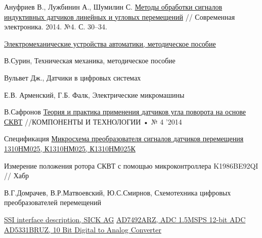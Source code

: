 \newpage
\renewcommand{\bibsection}{\centering\textbf{\large Список использованных источников}} %


\begin{thebibliography}{9}
    Ануфриев В., Лужбинин А., Шумилин С. 
    \href{https://www.milandr.ru/upload/iblock/4bf/4bf1c97fcce296a450d7b68bb0fc65b0.pdf}{Методы обработки сигналов индуктивных датчиков линейных и угловых перемещений} // Современная электроника. 2014. №4. С. 30–34.

    \href{https://servomotors.ru/documentation/electromechanical_automation_devices/book/about.html}{Электромеханические устройства автоматики, методическое пособие} 

     В.Сурин, Техническая механика, методическое пособие 

     Вульвет Дж., Датчики в цифровых системах

     Е.В. Арменский, Г.Б. Фалк, Электрические микромашины

    В.Сафронов
    \href{file:///home/viktor/Downloads/teoriya-i-praktika-primeneniya-datchikov-ugla-povorota-na-osnove-skvt.pdf}{Теория и практика применения датчиков угла поворота на основе СКВТ} 
    //КОМПОНЕНТЫ И ТЕХНОЛОГИИ • № 4 '2014

     Спецификация \href{https://support.milandr.ru/upload/iblock/6ba/e7vag2ixn36hmunuwj0av6g1gbcgvxbf/1310НМ025.pdf?ysclid=maczx9xrgr189178383}
    {Микросхема преобразователя сигналов датчиков перемещения 1310НМ025, К1310НМ025, К1310НМ025К}

     Измерение положения ротора СКВТ с помощью микроконтроллера K1986BE92QI // Хабр

     В.Г.Домрачев, В.Р.Матвоевский, Ю.С.Смирнов, Схемотехника цифровых преобразователей перемещений

     \href{https://cdn.sickcn.com/media/docs/9/79/079/technical_information_ssi_interface_description_en_im0100079.pdf}{SSI interface description, SICK AG}
     \href{https://static.chipdip.ru/lib/796/DOC011796076.pdf}{AD7492ARZ, ADC 1.5MSPS 12-bit ADC}
     \href{https://static.chipdip.ru/lib/526/DOC011526827.pdf}{AD5331BRUZ, 10 Bit Digital to Analog Converter}
\end{thebibliography} 